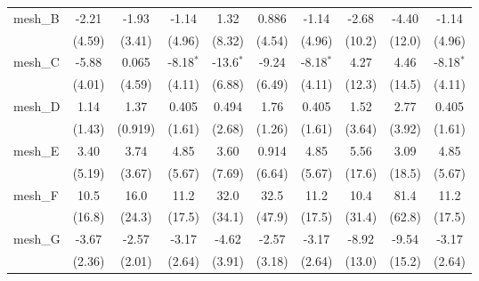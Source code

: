 \begin{tabular}{lccccccccc}
   mesh\_B                                                     & -2.21         & -1.93         & -1.14         & 1.32         & 0.886        & -1.14         & -2.68        & -4.40   & -1.14\\   
                                                               & (4.59)        & (3.41)        & (4.96)        & (8.32)       & (4.54)       & (4.96)        & (10.2)       & (12.0)  & (4.96)\\   
   mesh\_C                                                     & -5.88         & 0.065         & -8.18$^{*}$   & -13.6$^{*}$  & -9.24        & -8.18$^{*}$   & 4.27         & 4.46    & -8.18$^{*}$\\   
                                                               & (4.01)        & (4.59)        & (4.11)        & (6.88)       & (6.49)       & (4.11)        & (12.3)       & (14.5)  & (4.11)\\   
   mesh\_D                                                     & 1.14          & 1.37          & 0.405         & 0.494        & 1.76         & 0.405         & 1.52         & 2.77    & 0.405\\   
                                                               & (1.43)        & (0.919)       & (1.61)        & (2.68)       & (1.26)       & (1.61)        & (3.64)       & (3.92)  & (1.61)\\   
   mesh\_E                                                     & 3.40          & 3.74          & 4.85          & 3.60         & 0.914        & 4.85          & 5.56         & 3.09    & 4.85\\   
                                                               & (5.19)        & (3.67)        & (5.67)        & (7.69)       & (6.64)       & (5.67)        & (17.6)       & (18.5)  & (5.67)\\   
   mesh\_F                                                     & 10.5          & 16.0          & 11.2          & 32.0         & 32.5         & 11.2          & 10.4         & 81.4    & 11.2\\   
                                                               & (16.8)        & (24.3)        & (17.5)        & (34.1)       & (47.9)       & (17.5)        & (31.4)       & (62.8)  & (17.5)\\   
   mesh\_G                                                     & -3.67         & -2.57         & -3.17         & -4.62        & -2.57        & -3.17         & -8.92        & -9.54   & -3.17\\   
                                                               & (2.36)        & (2.01)        & (2.64)        & (3.91)       & (3.18)       & (2.64)        & (13.0)       & (15.2)  & (2.64)\\   

\end{tabular}

